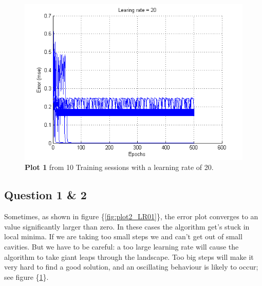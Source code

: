 \documentclass[a4paper]{article}
\begin{document}
\begin{figure}[h!] %
	\includegraphics[]{plot2_LR20.png}
	\caption{\label{fig:plot2_LR20}\textbf{Plot 1} from 10 Training sessions with a learning rate of 20.}
\end{figure}
\subsection*{Question 1 \& 2}
Sometimes, as shown in figure \{\ref{fig:plot2_LR01}\}, 
the error plot converges to an value significantly larger than zero.
In these cases the algorithm get's stuck in local minima. If we are taking too 
small steps we and can't get out of small cavities. But we have to be careful: 
a too large learning rate will cause the algorithm to take giant leaps through the landscape. 
Too big steps will make it very hard to find a good solution, and an oscillating 
behaviour is likely to occur; see figure \{\ref{fig:plot2_LR20}\}. 
\end{document}
